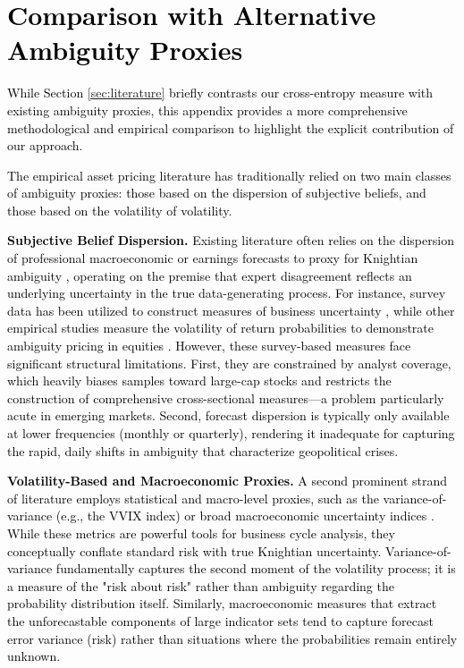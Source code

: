 \documentclass[preprint,12pt,authoryear]{elsarticle}
\begin{document}
\section{\textcolor{black}{Comparison with Alternative Ambiguity Proxies}}
\label{app:alternative_proxies}
\renewcommand{\theequation}{B.\arabic{equation}}
\setcounter{equation}{0}

\textcolor{black}{While Section \ref{sec:literature} briefly contrasts our cross-entropy measure with existing ambiguity proxies, this appendix provides a more comprehensive methodological and empirical comparison to highlight the explicit contribution of our approach.}

\textcolor{black}{The empirical asset pricing literature has traditionally relied on two main classes of ambiguity proxies: those based on the dispersion of subjective beliefs, and those based on the volatility of volatility.}

\textcolor{black}{\textbf{Subjective Belief Dispersion.} Existing literature often relies on the dispersion of professional macroeconomic or earnings forecasts to proxy for Knightian ambiguity \citep{Ulrich2013}, operating on the premise that expert disagreement reflects an underlying uncertainty in the true data-generating process. For instance, survey data has been utilized to construct measures of business uncertainty \citep{Bachmann2013}, while other empirical studies measure the volatility of return probabilities to demonstrate ambiguity pricing in equities \citep{Brenner2018}. However, these survey-based measures face significant structural limitations. First, they are constrained by analyst coverage, which heavily biases samples toward large-cap stocks and restricts the construction of comprehensive cross-sectional measures—a problem particularly acute in emerging markets. Second, forecast dispersion is typically only available at lower frequencies (monthly or quarterly), rendering it inadequate for capturing the rapid, daily shifts in ambiguity that characterize geopolitical crises.}

\textcolor{black}{\textbf{Volatility-Based and Macroeconomic Proxies.} A second prominent strand of literature employs statistical and macro-level proxies, such as the variance-of-variance (e.g., the VVIX index) or broad macroeconomic uncertainty indices \citep{Jurado2015}. While these metrics are powerful tools for business cycle analysis, they conceptually conflate standard risk with true Knightian uncertainty. Variance-of-variance fundamentally captures the second moment of the volatility process; it is a measure of the "risk about risk" rather than ambiguity regarding the probability distribution itself. Similarly, macroeconomic measures that extract the unforecastable components of large indicator sets tend to capture forecast error variance (risk) rather than situations where the probabilities remain entirely unknown.}
\end{document}
